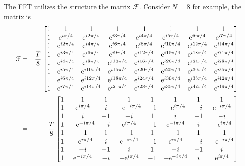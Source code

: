 The FFT utilizes the structure the matrix $\mathcal{F}$.  Consider $N=8$ for example, the matrix is 
\begin{eqnarray}
\mathcal{F} &=& \frac{T}{8}
\begin{bmatrix}
1 &               1 &               1 &               1 &               1 &               1 &               1 &               1 \\
1 &  \text{e}^{i  \pi/4} & \text{e}^{i  2\pi/4} & \text{e}^{i  3\pi/4} & \text{e}^{i  4\pi/4} & \text{e}^{i  5\pi/4} & \text{e}^{i  6\pi/4} & \text{e}^{i  7\pi/4} \\
1 &  \text{e}^{i 2\pi/4} & \text{e}^{i  4\pi/4} & \text{e}^{i  6\pi/4} & \text{e}^{i  8\pi/4} & \text{e}^{i 10\pi/4} & \text{e}^{i 12\pi/4} & \text{e}^{i 14\pi/4} \\
1 &  \text{e}^{i 3\pi/4} & \text{e}^{i  6\pi/4} & \text{e}^{i  9\pi/4} & \text{e}^{i 12\pi/4} & \text{e}^{i 15\pi/4} & \text{e}^{i 18\pi/4} & \text{e}^{i 21\pi/4} \\
1 &  \text{e}^{i 4\pi/4} & \text{e}^{i  8\pi/4} & \text{e}^{i 12\pi/4} & \text{e}^{i 16\pi/4} & \text{e}^{i 20\pi/4} & \text{e}^{i 24\pi/4} & \text{e}^{i 28\pi/4} \\
1 &  \text{e}^{i 5\pi/4} & \text{e}^{i 10\pi/4} & \text{e}^{i 15\pi/4} & \text{e}^{i 20\pi/4} & \text{e}^{i 25\pi/4} & \text{e}^{i 30\pi/4} & \text{e}^{i 35\pi/4} \\
1 &  \text{e}^{i 6\pi/4} & \text{e}^{i 12\pi/4} & \text{e}^{i 18\pi/4} & \text{e}^{i 24\pi/4} & \text{e}^{i 30\pi/4} & \text{e}^{i 36\pi/4} & \text{e}^{i 42\pi/4} \\
1 &  \text{e}^{i 7\pi/4} & \text{e}^{i 14\pi/4} & \text{e}^{i 21\pi/4} & \text{e}^{i 28\pi/4} & \text{e}^{i 35\pi/4} & \text{e}^{i 42\pi/4} & \text{e}^{i 49\pi/4} 
\end{bmatrix}\label{eq:Fmatrix1}\\
 &=& \frac{T}{8}
\begin{bmatrix}
1 &               1 &               1 &               1 &               1 &               1 &               1 &               1 \\
1 & \text{e}^{ i  \pi/4} &               i &-\text{e}^{-i  \pi/4} &              -1 &-\text{e}^{ i  \pi/4} &              -i & \text{e}^{-i  \pi/4} \\
1 &               i &              -1 &              -i &               1 &               i &              -1 &              -i \\
1 &-\text{e}^{-i  \pi/4} &              -i & \text{e}^{ i  \pi/4} &              -1 & \text{e}^{-i  \pi/4} &               i &-\text{e}^{ i  \pi/4} \\
1 &              -1 &               1 &              -1 &               1 &              -1 &               1 &              -1 \\
1 &-\text{e}^{ i  \pi/4} &               i & \text{e}^{-i  \pi/4} &              -1 & \text{e}^{ i  \pi/4} &              -i &-\text{e}^{-i  \pi/4} \\
1 &              -i &              -1 &               i &               1 &              -i &              -1 &               i \\
1 & \text{e}^{-i  \pi/4} &              -i &-\text{e}^{ i  \pi/4} &              -1 &-\text{e}^{-i  \pi/4} &               i & \text{e}^{ i  \pi/4} 
\end{bmatrix}\label{eq:Fmatrix2}
\end{eqnarray}
